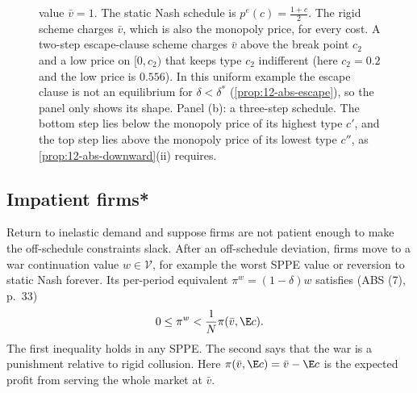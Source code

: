 \begin{figure}[htbp]
{value $\bar v = 1$. The static Nash schedule is $p^e(c) = \frac{1 + c}{2}$. The rigid scheme charges $\bar v$, which
is also the monopoly price, for every cost. A two-step escape-clause scheme charges $\bar v$ above the break point
$c_2$ and a low price on $[0, c_2)$ that keeps type $c_2$ indifferent (here $c_2 = 0.2$ and the low price is $0.556$).
In this uniform example the escape clause is not an equilibrium for $\delta < \delta^*$ (\cref{prop:12-abs-escape}),
so the panel only shows its shape. Panel (b): a three-step schedule. The bottom step lies below the monopoly price of
its highest type $c'$, and the top step lies above the monopoly price of its lowest type $c''$, as
\cref{prop:12-abs-downward}(ii) requires.}\label{fig:12-abs-schedules}
\end{figure}

\subsection{Impatient firms*}\label{sec:12-abs-impatient}

Return to inelastic demand and suppose firms are not patient enough to make the off-schedule constraints slack.
After an off-schedule deviation, firms move to a war continuation value $w \in \mathcal V$, for example the worst SPPE
value or reversion to static Nash forever. Its per-period equivalent $\pi^w = (1 - \delta)w$ satisfies (ABS (7), p.~33)
\begin{equation}\label{eq:12-abs-piw}
0 \le \pi^w < \frac{1}{N}\pi(\bar v, \E c) .
\end{equation}
The first inequality holds in any SPPE. The second says that the war is a punishment relative to rigid collusion.
Here $\pi(\bar v, \E c) = \bar v - \E c$ is the expected profit from serving the whole market at $\bar v$.

